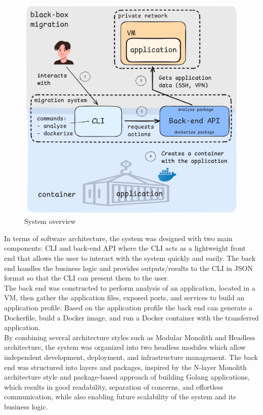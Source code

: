 \documentclass[twocolumn]{article}
\begin{document}
\begin{figure} [H]
    \centering
    \includegraphics[width=\linewidth]{images/system-overview.png}
    \caption{System overview}
    \label{fig:system-overview}
\end{figure}

In terms of software architecture, the system was designed with two main components: CLI and back-end API where the CLI acts as a lightweight front end that allows the user to interact with the system quickly and easily. The back end handles the business logic and provides outputs/results to the CLI in JSON format so that the CLI can present them to the user. \\

The back end was constructed to perform analysis of an application, located in a VM, then gather the application files, exposed ports, and services to build an application profile. Based on the application profile the back end can generate a Dockerfile, build a Docker image, and run a Docker container with the transferred application. \\

By combining several architecture styles such as Modular Monolith and Headless architecture, the system was organized into two headless modules which allow independent development, deployment, and infrastructure management. The back end was structured into layers and packages, inspired by the N-layer Monolith architecture style and package-based approach of building Golang applications, which results in good readability, separation of concerns, and effortless communication, while also enabling future scalability of the system and its business logic. \\
\end{document}
